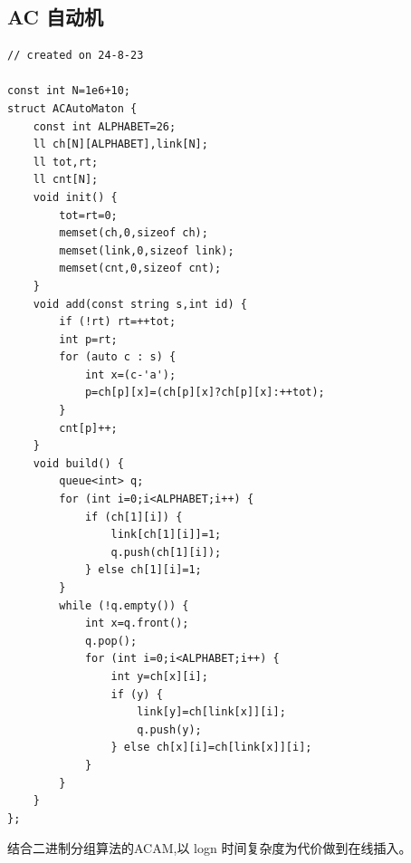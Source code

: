 \documentclass[a4paper,12pt]{article}
\begin{document}
\subsection{AC 自动机}

\begin{lstlisting}
// created on 24-8-23

const int N=1e6+10;
struct ACAutoMaton {
    const int ALPHABET=26;
    ll ch[N][ALPHABET],link[N];
    ll tot,rt;
    ll cnt[N];
    void init() {
        tot=rt=0;
        memset(ch,0,sizeof ch);
        memset(link,0,sizeof link);
        memset(cnt,0,sizeof cnt);
    }
    void add(const string s,int id) {
        if (!rt) rt=++tot;
        int p=rt;
        for (auto c : s) {
            int x=(c-'a');
            p=ch[p][x]=(ch[p][x]?ch[p][x]:++tot);
        }
        cnt[p]++;
    }
    void build() {
        queue<int> q;
        for (int i=0;i<ALPHABET;i++) {
            if (ch[1][i]) {
                link[ch[1][i]]=1;
                q.push(ch[1][i]);
            } else ch[1][i]=1;
        }
        while (!q.empty()) {
            int x=q.front();
            q.pop();
            for (int i=0;i<ALPHABET;i++) {
                int y=ch[x][i];
                if (y) {
                    link[y]=ch[link[x]][i];
                    q.push(y);
                } else ch[x][i]=ch[link[x]][i];
            }
        }
    }
};
\end{lstlisting}

\noindent 结合二进制分组算法的ACAM,以 logn 时间复杂度为代价做到在线插入。
\end{document}
